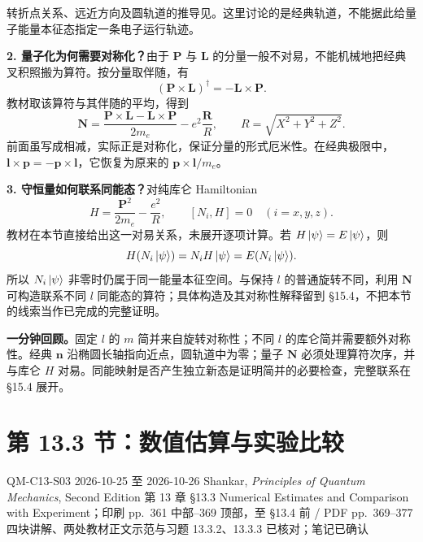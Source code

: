 转折点关系、远近方向及圆轨道的推导见。这里讨论的是经典轨道，不能据此给量子能量本征态指定一条电子运行轨迹。

\textbf{2. 量子化为何需要对称化？}由于 $\mathbf P$ 与 $\mathbf L$ 的分量一般不对易，不能机械地把经典叉积照搬为算符。按分量取伴随，有
\begin{equation}
  (\mathbf P\times\mathbf L)^\dagger=-\mathbf L\times\mathbf P.
\end{equation}
教材取该算符与其伴随的平均，得到
\begin{equation}
  \boxed{\mathbf N=\frac{\mathbf P\times\mathbf L-\mathbf L\times\mathbf P}{2m_e}
       -e^2\frac{\mathbf R}{R},\qquad R=\sqrt{X^2+Y^2+Z^2}.}
\end{equation}
前面虽写成相减，实际正是对称化，保证分量的形式厄米性。在经典极限中，$\mathbf l\times\mathbf p=-\mathbf p\times\mathbf l$，它恢复为原来的 $\mathbf p\times\mathbf l/m_e$。

\textbf{3. 守恒量如何联系同能态？}对纯库仑 Hamiltonian
\begin{equation}
  H=\frac{\mathbf P^2}{2m_e}-\frac{e^2}{R},\qquad
  \boxed{[N_i,H]=0\quad(i=x,y,z).}
\end{equation}
教材在本节直接给出这一对易关系，未展开逐项计算。若 $H\left|\psi\right\rangle=E\left|\psi\right\rangle$，则
\begin{equation}
  H(N_i\left|\psi\right\rangle)=N_iH\left|\psi\right\rangle=E(N_i\left|\psi\right\rangle).
\end{equation}
所以 $N_i\left|\psi\right\rangle$ 非零时仍属于同一能量本征空间。与保持 $l$ 的普通旋转不同，利用 $\mathbf N$ 可构造联系不同 $l$ 同能态的算符；具体构造及其对称性解释留到 \S 15.4，不把本节的线索当作已完成的完整证明。


\textbf{一分钟回顾。}固定 $l$ 的 $m$ 简并来自旋转对称性；不同 $l$ 的库仑简并需要额外对称性。经典 $\mathbf n$ 沿椭圆长轴指向近点，圆轨道中为零；量子 $\mathbf N$ 必须处理算符次序，并与库仑 $H$ 对易。同能映射是否产生独立新态是证明简并的必要检查，完整联系在 \S 15.4 展开。

\section{第 13.3 节：数值估算与实验比较}
\label{section:QM-C13-S03}
\studymeta
  {QM-C13-S03}
  {2026-10-25 至 2026-10-26}
  {Shankar, \textit{Principles of Quantum Mechanics}, Second Edition}
  {第 13 章 \S 13.3 Numerical Estimates and Comparison with Experiment；印刷 pp.~361 中部--369 顶部，至 \S 13.4 前 / PDF pp.~369--377}
  {四块讲解、两处教材正文示范与习题 13.3.2、13.3.3 已核对；笔记已确认}

